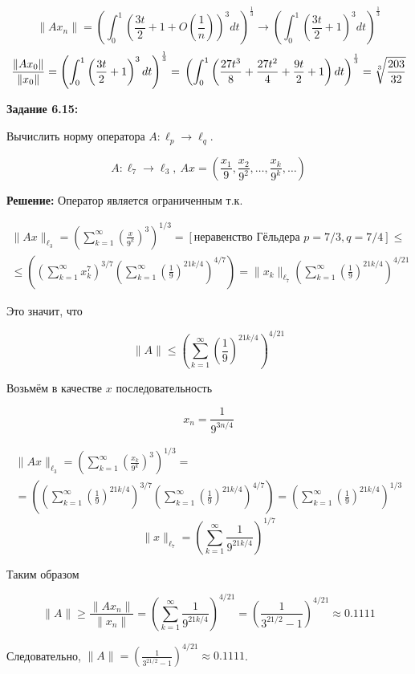 \documentclass[12pt, a4paper]{report}
\begin{document}
\[
    \| A x_n\| = \left( \int_{0}^{1} \left( \frac{3t}{2} + 1 + O\left( \frac{1}{n} \right) \right)^3 dt\right)^{\frac{1}{3}} \to 
    \left( \int_{0}^{1} \left( \frac{3t}{2} + 1 \right)^3 dt \right)^{\frac{1}{3}}
\]
\[ \frac{\|A x_0\|}{\| x_0 \|} = \left( \int_{0}^{1} \left( \frac{3t}{2} + 1 \right)^3 dt \right)^{\frac{1}{3}} =\\
\left( \int_{0}^{1} \left( \frac{27t^3}{8} + \frac{27t^2}{4} + \frac{9t}{2} + 1 \right) dt \right)^{\frac{1}{3}} =\\
\sqrt[3]{\frac{203}{32}} \]


\textbf{Задание 6.15:}

Вычислить норму оператора $A: \ell_p \to \ell_q$.

\[A:\ell_7 \to \ell_3,\ Ax = \left(\frac{x_1}{9}, \frac{x_2}{9^2}, \dots, \frac{x_k}{9^k}, \dots \right)\]

\textbf{Решение:} Оператор является ограниченным т.к.

\begin{multline*}
    \| A x \|_{\ell_3} = \left( \sum_{k = 1}^{\infty} \left( \frac{x}{9^k} \right)^3 \right)^{1/3} =
    [\text{неравенство Гёльдера } p = 7/3, q = 7/4] \le \\ \le 
    \left( \left( \sum_{k=1}^{\infty} x_k^7 \right)^{3/7} 
    \left( \sum_{k=1}^{\infty} \left( \frac{1}{9} \right)^{21k/4} \right)^{4/7} \right) =
    \| x_k \|_{\ell_7} \left( \sum_{k=1}^{\infty} \left( \frac{1}{9} \right)^{21k/4} \right)^{4/21}
\end{multline*}

Это значит, что

\[\| A \| \le \left(\sum_{k=1}^{\infty} \left( \frac{1}{9} \right)^{21k/4} \right)^{4/21} \]

Возьмём в качестве $x$ последовательность

\[x_n = \frac{1}{9^{3n/4}}\]

\begin{multline*}
    \| A x \|_{\ell_3} = \left( \sum_{k = 1}^{\infty} \left( \frac{x_k}{9^k} \right)^3 \right)^{1/3} =\\=
    \left( \left( \sum_{k=1}^{\infty} \left( \frac{1}{9} \right)^{21k/4} \right)^{3/7}
    \left( \sum_{k=1}^{\infty} \left( \frac{1}{9} \right)^{21k/4} \right)^{4/7} \right) =
    \left( \sum_{k = 1}^{\infty} \left( \frac{1}{9} \right)^{21k/4} \right)^{1/3}
\end{multline*}
\[
    \| x \|_{\ell_7} = \left( \sum_{k=1}^{\infty} \frac{1}{9^{21k/4}} \right)^{1/7}
\]

Таким образом

\[\| A \| \ge \frac{\|Ax_n\|}{\|x_n\|} = \left( \sum_{k = 1}^{\infty} \frac{1}{9^{21k/4}} \right)^{4/21} =
\left(\frac{1}{3^{21/2} - 1}\right)^{4/21} \approx 0.1111 \]

Следовательно, $\| A \| = \left(\frac{1}{3^{21/2} - 1}\right)^{4/21} \approx 0.1111$.
\end{document}
